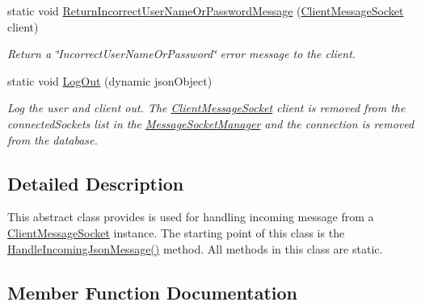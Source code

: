 \begin{DoxyCompactItemize}
static void \hyperlink{class_e_l_i_server_1_1_messaging_1_1_message_handler_a9594cb08cdb01a3ae81e0e794447ff9c}{Return\+Incorrect\+User\+Name\+Or\+Password\+Message} (\hyperlink{class_e_l_i_server_1_1_messaging_1_1_client_message_socket}{Client\+Message\+Socket} client)
\begin{DoxyCompactList}\small\item\em Return a \char`\"{}\+Incorrect\+User\+Name\+Or\+Password\char`\"{} error message to the client. \end{DoxyCompactList}\item 
static void \hyperlink{class_e_l_i_server_1_1_messaging_1_1_message_handler_a1fe43aa94ee3e3d03fcf147549eabced}{Log\+Out} (dynamic json\+Object)
\begin{DoxyCompactList}\small\item\em Log the user and client out. The \hyperlink{class_e_l_i_server_1_1_messaging_1_1_client_message_socket}{Client\+Message\+Socket} client is removed from the connected\+Sockets list in the \hyperlink{class_e_l_i_server_1_1_message_socket_manager}{Message\+Socket\+Manager} and the connection is removed from the database. \end{DoxyCompactList}\end{DoxyCompactItemize}


\subsection{Detailed Description}
This abstract class provides is used for handling incoming message from a \hyperlink{class_e_l_i_server_1_1_messaging_1_1_client_message_socket}{Client\+Message\+Socket} instance. The starting point of this class is the \hyperlink{class_e_l_i_server_1_1_messaging_1_1_message_handler_a54b8fc68511fe197932338c0ffdb75c0}{Handle\+Incoming\+Json\+Message()} method. All methods in this class are static. 



\subsection{Member Function Documentation}
\mbox{\label{class_e_l_i_server_1_1_messaging_1_1_message_handler_a3dd06c4f9c959db12a96af3397114861}} 
